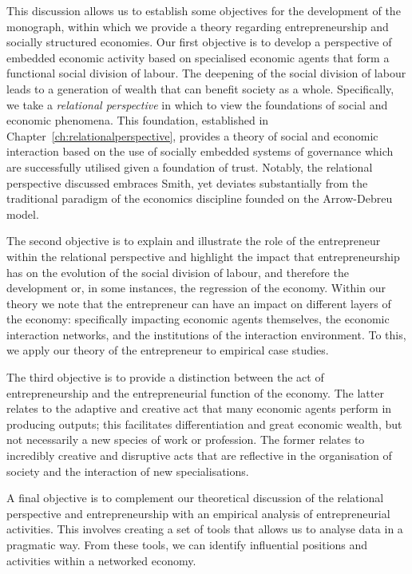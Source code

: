 This discussion allows us to establish some objectives for the development of the monograph, within which we provide a theory regarding entrepreneurship and socially structured economies. Our first objective is to develop a perspective of embedded economic activity based on specialised economic agents that form a functional social division of labour. The deepening of the social division of labour leads to a generation of wealth that can benefit society as a whole. Specifically, we take a \emph{relational perspective} in which to view the foundations of social and economic phenomena. This foundation, established in Chapter~\ref{ch:relationalperspective}, provides a theory of social and economic interaction based on the use of socially embedded systems of governance which are successfully utilised given a foundation of trust. Notably, the relational perspective discussed embraces Smith, yet deviates substantially from the traditional paradigm of the economics discipline founded on the Arrow-Debreu model.

The second objective is to explain and illustrate the role of the entrepreneur within the relational perspective and highlight the impact that entrepreneurship has on the evolution of the social division of labour, and therefore the development or, in some instances, the regression of the economy. Within our theory we note that the entrepreneur can have an impact on different layers of the economy: specifically impacting economic agents themselves, the economic interaction networks, and the institutions of the interaction environment. To this, we apply our theory of the entrepreneur to empirical case studies.

The third objective is to provide a distinction between the act of entrepreneurship and the entrepreneurial function of the economy. The latter relates to the adaptive and creative act that many economic agents perform in producing outputs; this facilitates differentiation and great economic wealth, but not necessarily a new species of work or profession. The former relates to incredibly creative and disruptive acts that are reflective in the organisation of society and the interaction of new specialisations.

A final objective is to complement our theoretical discussion of the relational perspective and entrepreneurship with an empirical analysis of entrepreneurial activities. This involves creating a set of tools that allows us to analyse data in a pragmatic way. From these tools, we can identify influential positions and activities within a networked economy.

